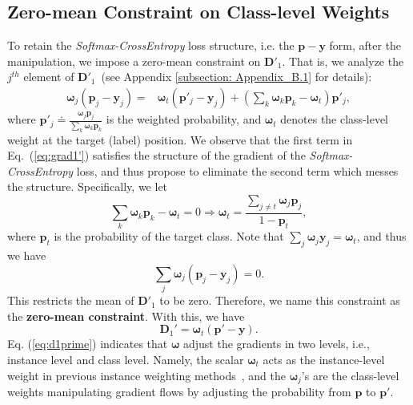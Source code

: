 \subsection{Zero-mean Constraint on Class-level Weights}
\label{subsec:restOn}
%
To retain the \textit{Softmax-CrossEntropy} loss structure, i.e. the $\boldsymbol p -\boldsymbol y$ form, after the manipulation, we impose a zero-mean constraint on $\mathbf{D}'_1$.
%
That is, we analyze the $j^{th}$ element of $\mathbf{D}'_1$~(see Appendix \ref{subsection: Appendix_B.1} for details):
\begin{align}
    \boldsymbol{\omega}_j(\boldsymbol{p}_j-\mathbf{y}_j) =& \boldsymbol{\omega}_t\left({\boldsymbol{p}'_j} - {\mathbf{y}_j}\right) + \left(\sum_k{{\boldsymbol{\omega}_k} {\boldsymbol{p}_k}}-\boldsymbol{\omega}_t\right){\boldsymbol{p}'_j}\label{eq:grad1'},
\end{align}
%
where $\boldsymbol{p}'_j \doteq \frac{\boldsymbol{\omega}_j\boldsymbol{p}_j}{\sum_k \boldsymbol{\omega}_k\boldsymbol{p}_k}$ is the weighted probability, and $\boldsymbol{\omega}_t$ denotes the class-level weight at the target (label) position.
%
We observe that the first term in Eq.~(\ref{eq:grad1'}) satisfies the structure of the gradient of the \textit{Softmax-CrossEntropy} loss, and thus propose to eliminate the second term which messes the structure.
%
Specifically, we let
\begin{equation}
    \label{eq:constraint}
     \sum_k{{\boldsymbol{\omega}_k} {\boldsymbol{p}_k}} - \boldsymbol{\omega}_t = 0\Rightarrow \boldsymbol{\omega}_t = \frac{\sum_{j\neq t}\boldsymbol{\omega}_j \boldsymbol{p}_j}{1 - \boldsymbol{p}_t},
\end{equation}
%
where $\boldsymbol{p}_t$ is the probability of the target class.
%
Note that $\sum_j \boldsymbol{\omega}_j\mathbf{y}_j = \boldsymbol{\omega}_t$, and thus we have
\begin{equation}
    \label{eq:constraint2}
    \sum_j\boldsymbol{\omega}_j(\boldsymbol{p}_j-\mathbf{y}_j) = 0.
\end{equation}
%
This restricts the mean of $\mathbf{D}'_1$ to be zero. 
%
Therefore,  we name this constraint as the \textbf{zero-mean constraint}.
%
With this, we have
\begin{equation}
    \label{eq:d1prime}
\mathbf D_1'= \boldsymbol{\omega}_t \left( \boldsymbol{p}' - \mathbf y\right).
\end{equation}
Eq. (\ref{eq:d1prime}) indicates that $\boldsymbol \omega$ adjust the gradients in two levels, i.e., instance level and class level.
%
Namely, the scalar $\boldsymbol{\omega}_t$ acts as the instance-level weight in previous instance weighting methods~\cite{renLearningReweightExamples2018,shuMetaWeightNetLearningExplicit2019a,huLearningDataManipulation2019a,wangOptimizingDataUsage2020b}, and the $\boldsymbol \omega_j$'s are the class-level weights manipulating gradient flows by adjusting the probability from $\mathbf p$ to $\mathbf p'$. 

